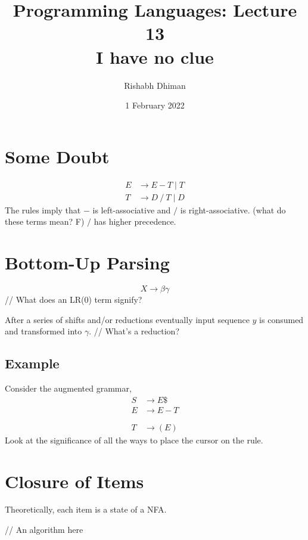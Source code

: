 \documentclass[a4paper]{scrartcl}
\title{
	Programming Languages: Lecture 13\\
	I have no clue
}
\author{Rishabh Dhiman}
\date{1 February 2022}
\theoremstyle{definition}
\begin{document}
\maketitle

\section{Some Doubt}
\begin{align*}
	E &\to E - T \mid T\\
	T &\to D \mathrel{/} T \mid D
\end{align*}
The rules imply that $-$ is left-associative and $/$ is right-associative. (what do these terms mean? F) $/$ has higher precedence.

\section{Bottom-Up Parsing}
\[X \to \beta \gamma\]
// What does an LR(0) term signify?

After a series of shifts and/or reductions eventually input sequence $y$ is consumed and transformed into $\gamma$. // What's a reduction?

\subsection{Example}
Consider the augmented grammar,
\begin{align}
	S &\to E\$\\
	E &\to E - T\\
	\\
	\\
	T &\to (E)
\end{align}
Look at the significance of all the ways to place the cursor on the rule.

\section{Closure of Items}
Theoretically, each item is a state of a NFA.

// An algorithm here
\end{document}
